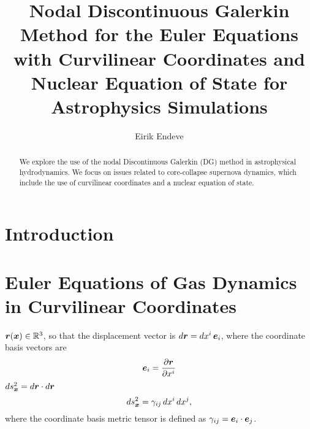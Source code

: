 \documentclass[10pt,preprint]{aastex}
\begin{document}
\title{Nodal Discontinuous Galerkin Method for the Euler Equations with Curvilinear Coordinates and Nuclear Equation of State for Astrophysics Simulations}
\author{Eirik Endeve}

\begin{abstract}
We explore the use of the nodal Discontinuous Galerkin (DG) method in astrophysical hydrodynamics.  
We focus on issues related to core-collapse supernova dynamics, which include the use of curvilinear coordinates and a nuclear equation of state.  
\end{abstract}

\section{Introduction}

\section{Euler Equations of Gas Dynamics in Curvilinear Coordinates}

$\boldsymbol{r}(\boldsymbol{x})\in\mathbb{R}^{3}$, so that the displacement vector is $d\boldsymbol{r}=dx^{i}\,\boldsymbol{e}_{i}$, where the coordinate basis vectors are
\begin{equation}
  \boldsymbol{e}_{i}=\frac{\partial \boldsymbol{r}}{\partial x^{i}}
\end{equation}
$ds_{\boldsymbol{x}}^{2}=d\boldsymbol{r}\cdot d\boldsymbol{r}$
\begin{equation}
  ds_{\boldsymbol{x}}^{2}=\gamma_{ij}\,dx^{i}\,dx^{j},
\end{equation}
where the coordinate basis metric tensor is defined as $\gamma_{ij}=\boldsymbol{e}_{i}\cdot\boldsymbol{e}_{j}$.  
\end{document}
